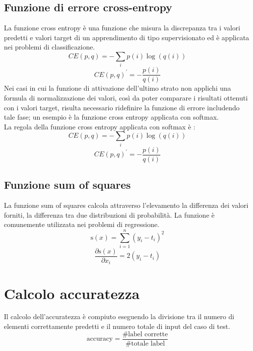 \subsection{Funzione di errore cross-entropy}
La funzione cross entropy è una funzione che misura la discrepanza tra i valori predetti e valori target di un apprendimento di tipo supervisionato ed è applicata nei problemi di classificazione.
\begin{equation}
CE(p,q) = -\sum_{i} p(i) \log(q(i))
\end{equation}
\begin{equation}
CE(p,q)^{\prime}= -\frac{p(i)}{q(i)}
\end{equation}
Nei casi in cui la funzione di attivazione dell'ultimo strato non applichi una formula di normalizzazione dei valori, così da poter comparare i risultati ottenuti con i valori target, risulta necessario ridefinire la funzione di errore includendo tale fase; un esempio è la funzione cross entropy applicata con softmax.\\
La regola della funzione cross entropy applicata con softmax è :
\begin{equation}
CE(p,q) = -\sum_{i} p(i) \log(q(i))
\end{equation}
\begin{equation}
CE(p,q)^{\prime} = -\frac{p(i)}{q(i)}
\end{equation}
\subsection{Funzione sum of squares}
La funzione sum of squares calcola attraverso l'elevamento la differenza dei valori forniti, la differenza tra due distribuzioni di probabilità. La funzione è comunemente utilizzata nei problemi di regressione.
\begin{equation}
\text{s}(x) = \sum_{i=1}^{n} (y_i - t_i)^2
\end{equation}
\begin{equation}
\frac{\partial \text{s}(x)}{\partial x_i} = 2 (y_i - t_i)
\end{equation}

\section{Calcolo accuratezza}
Il calcolo dell'accuratezza è compiuto eseguendo la divisione tra il numero di elementi correttamente predetti e il numero totale di input del caso di test.
\begin{equation}
\text{accuracy} = \frac{\text{\# label corrette}}{\text{\# totale label}}
\end{equation}

